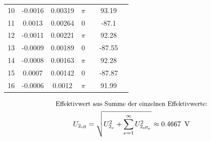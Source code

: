 \documentclass[a4paper, 12pt]{article}
\begin{document}
\begin{table}[H]
\begin{center}
\begin{tabular}{@{}ccccccc@{}}
        10    & -0.0016                             & 0.00319                       & $\pi$  &                               & 93.19                            &                                  \\
        11    & 0.0013                              & 0.00264                       & 0      &                               & -87.1                            &                                  \\
        12    & -0.0011                             & 0.00221                       & $\pi$  &                               & 92.28                            &                                  \\
        13    & -0.0009                             & 0.00189                       & 0      &                               & -87.55                           &                                  \\
        14    & -0.0008                             & 0.00163                       & $\pi$  &                               & 92.28                            &                                  \\
        15    & 0.0007                              & 0.00142                       & 0      &                               & -87.87                           &                                  \\
        16    & -0.0006                             & 0.0012                        & $\pi$  &                               & 91.99                            &                                  \\ \bottomrule
        \end{tabular}
        \end{center}
        \end{table}

      \begin{gather*}
        \text{\small Effektivwert aus Summe der einzelnen Effektivwerte:}\\
        U_{2_{\text{eff}}} = \sqrt{ U_{2_\nu}^2 + \sum_{\nu=1}^{\infty}{U_{2_{{\text{eff}}_\nu}}^2}} \approx 0.4667 \,\ \si{\volt}
      \end{gather*}
\end{document}
